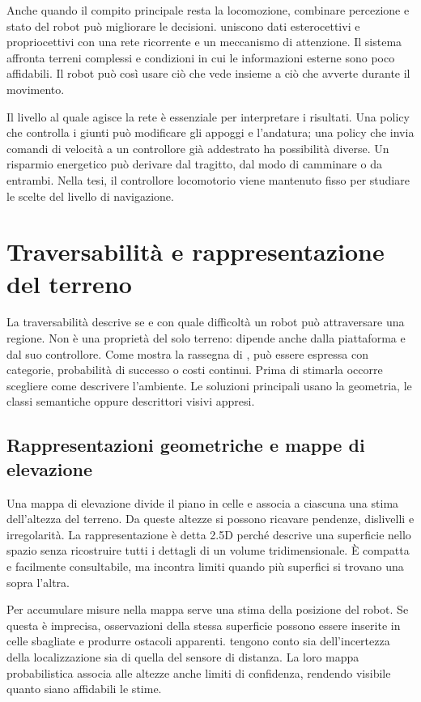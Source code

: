 Anche quando il compito principale resta la locomozione, combinare percezione e stato del robot può migliorare le decisioni. \citet{Miki2022Perceptive} uniscono dati esterocettivi e propriocettivi con una rete ricorrente e un meccanismo di attenzione. Il sistema affronta terreni complessi e condizioni in cui le informazioni esterne sono poco affidabili. Il robot può così usare ciò che vede insieme a ciò che avverte durante il movimento.

Il livello al quale agisce la rete è essenziale per interpretare i risultati. Una policy che controlla i giunti può modificare gli appoggi e l'andatura; una policy che invia comandi di velocità a un controllore già addestrato ha possibilità diverse. Un risparmio energetico può derivare dal tragitto, dal modo di camminare o da entrambi. Nella tesi, il controllore locomotorio viene mantenuto fisso per studiare le scelte del livello di navigazione.

\section{Traversabilità e rappresentazione del terreno}
\label{sec:sota-rappresentazioni}

La traversabilità descrive se e con quale difficoltà un robot può attraversare una regione. Non è una proprietà del solo terreno: dipende anche dalla piattaforma e dal suo controllore. Come mostra la rassegna di \citet{Sevastopoulos2022Survey}, può essere espressa con categorie, probabilità di successo o costi continui. Prima di stimarla occorre scegliere come descrivere l'ambiente. Le soluzioni principali usano la geometria, le classi semantiche oppure descrittori visivi appresi.

\subsection{Rappresentazioni geometriche e mappe di elevazione}

Una mappa di elevazione divide il piano in celle e associa a ciascuna una stima dell'altezza del terreno. Da queste altezze si possono ricavare pendenze, dislivelli e irregolarità. La rappresentazione è detta 2.5D perché descrive una superficie nello spazio senza ricostruire tutti i dettagli di un volume tridimensionale. È compatta e facilmente consultabile, ma incontra limiti quando più superfici si trovano una sopra l'altra.

Per accumulare misure nella mappa serve una stima della posizione del robot. Se questa è imprecisa, osservazioni della stessa superficie possono essere inserite in celle sbagliate e produrre ostacoli apparenti. \citet{Fankhauser2018Mapping} tengono conto sia dell'incertezza della localizzazione sia di quella del sensore di distanza. La loro mappa probabilistica associa alle altezze anche limiti di confidenza, rendendo visibile quanto siano affidabili le stime.

